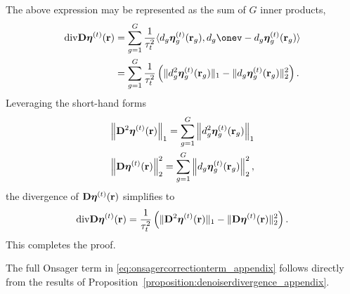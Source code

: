 \documentclass[journal]{IEEEtran}
\begin{document}
\begin{IEEEproof}
The above expression may be represented as the sum of $G$ inner products,
    \begin{equation*}
        \begin{split}
            \mathrm{div}\Dm\etav^{(t)}(\rv) &= \sum_{g = 1}^{G}\frac{1}{\tau_t^2} \langle d_{g} \etav^{(t)}_{g}(\rv_{g}), d_{g}\onev - d_{g}\etav^{(t)}_{g}(\rv_{g})\rangle \\
            &= \sum_{g = 1}^{G} \frac{1}{\tau_t^2}\left( \|d_g^2 \etav_g^{(t)}(\rv_g)\|_{1} -\|d_g \etav_{g}^{(t)}(\rv_g)\|_2^2 \right) .
        \end{split}
    \end{equation*}
    Leveraging the short-hand forms
    \begin{align*}
    \left\| \mathbf{D}^2 \boldsymbol{\eta}^{(t)}(\mathbf{r}) \right\|_{1} = \sum_{g = 1}^{G} \left\| d_g^2\boldsymbol{\eta}_{g}^{(t)}(\mathbf{r}_g) \right\|_{1} \\
    \left\| \mathbf{D} \boldsymbol{\eta}^{(t)}(\mathbf{r}) \right\|_2^2 = \sum_{g = 1}^{G} \left\| d_g \boldsymbol{\eta}_g^{(t)}(\mathbf{r}_g) \right\|_2^2 ,
    \end{align*}
    the divergence of $\mathbf{D}\boldsymbol{\eta}^{(t)}(\mathbf{r})$ simplifies to
    \begin{equation*}
        \mathrm{div}\mathbf{D}\boldsymbol{\eta}^{(t)}(\mathbf{r}) = \frac{1}{\tau_t^2}\left( \|\mathbf{D}^2 \boldsymbol{\eta}^{(t)}(\mathbf{r})\|_1 - \|\mathbf{D} \boldsymbol{\eta}^{(t)}(\mathbf{r})\|_2^2 \right) .
    \end{equation*}
This completes the proof.
\end{IEEEproof}

The full Onsager term in \eqref{eq:onsagercorrectionterm_appendix} follows directly from the results of Proposition~\ref{proposition:denoiserdivergence_appendix}. 




\end{document}
